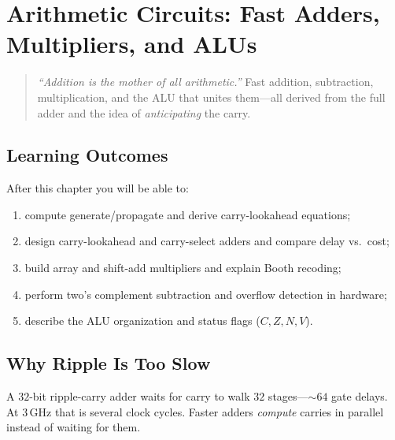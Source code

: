 \chapter{Arithmetic Circuits: Fast Adders, Multipliers, and ALUs}
\label{ch:arithmetic}

\begin{quote}
\emph{``Addition is the mother of all arithmetic.''}
Fast addition, subtraction, multiplication, and the ALU that unites them---all
derived from the full adder and the idea of \emph{anticipating} the carry.
\end{quote}

\noindent{}
\vspace{0.4em}

\section*{Learning Outcomes}
After this chapter you will be able to:
\begin{enumerate}[label=(L\arabic*)]
    \item compute generate/propagate and derive carry-lookahead equations;
    \item design carry-lookahead and carry-select adders and compare delay vs.\ cost;
    \item build array and shift-add multipliers and explain Booth recoding;
    \item perform two's complement subtraction and overflow detection in hardware;
    \item describe the ALU organization and status flags ($C,Z,N,V$).
\end{enumerate}

\section{Why Ripple Is Too Slow}
\label{sec:ripple-slow}
A $32$-bit ripple-carry adder waits for carry to walk $32$ stages---$\sim64$ gate delays.
At $3$\,GHz that is several clock cycles. Faster adders \emph{compute} carries in parallel
instead of waiting for them.

